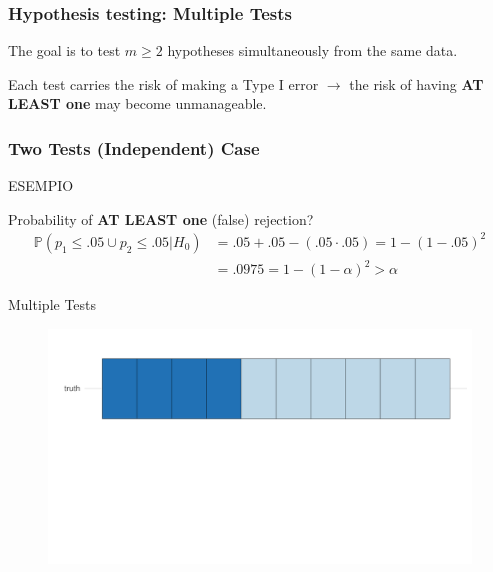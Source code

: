\documentclass[xcolor={dvipsnames}]{beamer}
\newcommand{\rbf}[1]{\textcolor{redUnipd}{ #1}}
\begin{document}
\begin{frame}
\frametitle{Hypothesis testing: Multiple Tests}

The goal is to test $m \ge 2$ hypotheses simultaneously from the same data.

\bigskip

Each test carries the risk of making a \rbf{Type I error} $\rightarrow$ the risk of having \textbf{ AT LEAST one} may become unmanageable.    
\end{frame}


\begin{frame}
\frametitle{Two Tests (Independent) Case}

ESEMPIO

\bigskip

Probability of \textbf{ AT LEAST one} (false) rejection?\
\bigskip
\begin{align*}
\mathbb{P}(p_1\leq .05 \cup p_2\leq .05 | H_0) &= 
.05+.05-(.05\cdot .05)=1-(1-.05)^2 \\
&=.0975=1-(1-\alpha)^2 > \alpha
\end{align*}


\end{frame}

\begin{frame}{Multiple Tests}
    \begin{figure}
        \centering
        \includegraphics[width = \textwidth]{Slides/MTP/plaatjes/mt1.pdf}

    \end{figure}
\end{frame}
\end{document}
